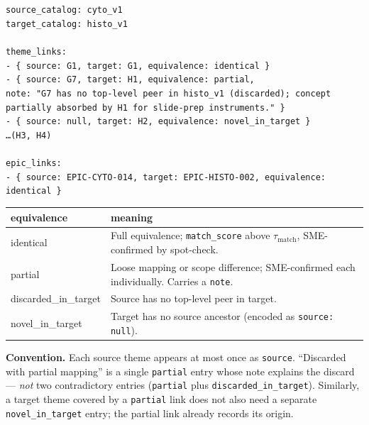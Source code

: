 \documentclass[10pt,letterpaper]{article}
\begin{document}
\noindent\texttt{\scriptsize source\_catalog: cyto\_v1\\
target\_catalog: histo\_v1\\
\\
theme\_links:\\
\hspace*{1em}- \{ source: G1, target: G1, equivalence: identical \}\\
\hspace*{1em}- \{ source: G7, target: H1, equivalence: partial,\\
\hspace*{2em}note: "G7 has no top-level peer in histo\_v1 (discarded); concept partially absorbed by H1 for slide-prep instruments." \}\\
\hspace*{1em}- \{ source: null, target: H2, equivalence: novel\_in\_target \}\\
\hspace*{1em}\ldots (H3, H4)\\
\\
epic\_links:\\
\hspace*{1em}- \{ source: EPIC-CYTO-014, target: EPIC-HISTO-002, equivalence: identical \}}

\begin{tabularx}{\textwidth}{@{}>{\ttfamily}p{2.5cm}X@{}}
\toprule
\textbf{equivalence} & \textbf{meaning} \\
\midrule
identical & Full equivalence; \texttt{match\_score} above $\tau_{\text{match}}$, SME-confirmed by spot-check. \\
partial & Loose mapping or scope difference; SME-confirmed each individually. Carries a \texttt{note}. \\
discarded\_in\_target & Source has no top-level peer in target. \\
novel\_in\_target & Target has no source ancestor (encoded as \texttt{source: null}). \\
\bottomrule
\end{tabularx}

\textbf{Convention.} Each source theme appears at most once as \texttt{source}. ``Discarded with partial mapping'' is a single \texttt{partial} entry whose note explains the discard --- \emph{not} two contradictory entries (\texttt{partial} plus \texttt{discarded\_in\_target}). Similarly, a target theme covered by a \texttt{partial} link does not also need a separate \texttt{novel\_in\_target} entry; the partial link already records its origin.
\end{document}
